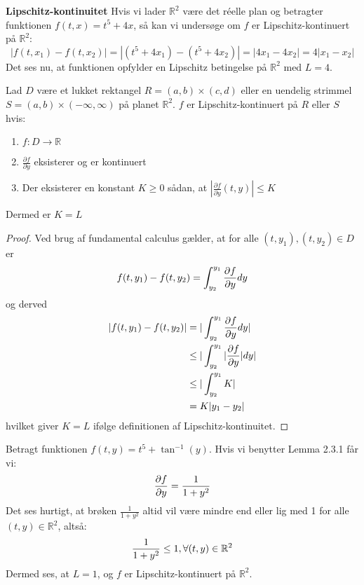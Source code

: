 \begin{Example}\textbf{Lipschitz-kontinuitet}\hfill \break
\textnormal{Hvis vi lader $\mathbb{R}^2$ være det réelle plan og betragter funktionen $f(t,x)=t^5+4x$, så kan vi undersøge om $f$ er Lipschitz-kontinuert på $\mathbb{R}^2$:} \hfill \break
$$|f(t,x_1)-f(t,x_2)|=|(t^5+4x_1)-(t^5+4x_2)|=|4x_1-4x_2|=4|x_1-x_2|$$ \hfill \break
\textnormal{Det ses nu, at funktionen opfylder en Lipschitz betingelse på $\mathbb{R}^2$ med $L=4$.}
\end{Example}
\begin{lemma}{}{}
Lad $D$ være et lukket rektangel $R=(a,b)\times(c,d)$ eller en uendelig strimmel $S=(a,b)\times(-\infty,\infty)$ på planet $\mathbb{R}^2$. $f$ er Lipschitz-kontinuert på $R$ eller $S$ hvis:

\begin{enumerate}
    \item $f:D \rightarrow \mathbb{R}$
    \item $\frac{\partial f}{\partial y}$ eksisterer og er kontinuert
    \item Der eksisterer en konstant $K\geq 0$ sådan, at $|\frac{\partial f}{\partial y}(t,y)|\leq K$
\end{enumerate}

Dermed er $K=L$
\end{lemma}
\begin{proof} \hfill \break
Ved brug af fundamental calculus gælder, at for alle $(t,y_1),(t,y_2) \in D$ er
\begin{align}
 f(t,y_1)-f(t,y_2)=\int_{y_2}^{y_1}\frac{\partial f}{\partial y} dy \notag
\end{align}
og derved
\begin{align}
 |f(t,y_1)-f(t,y_2)|&=|\int_{y_2}^{y_1}\frac{\partial f}{\partial y} dy| \notag \\
&\leq |\int_{y_2}^{y_1}|\frac{\partial f}{\partial y}| dy| \notag\\
&\leq |\int_{y_2}^{y_1}K| \notag \\
&=K|y_1-y_2| \notag
\end{align}
hvilket giver $K=L$ ifølge definitionen af Lipschitz-kontinuitet. \qedhere
\end{proof}
\hfill \break

\begin{Example}\hfill \break
\textnormal{Betragt funktionen $f(t,y)=t^5+\tan^{-1}(y)$. Hvis vi benytter Lemma 2.3.1 får vi:} \hfill \break
\begin{align}
\frac{\partial f}{\partial y}=\frac{1}{1+y^2} \notag
\end{align}
\textnormal{Det ses hurtigt, at brøken $\frac{1}{1+y^2}$ altid vil være mindre end eller lig med 1 for alle $(t,y)\in \mathbb{R}^2$, altså:}
\begin{align}
 \frac{1}{1+y^2}\leq 1, \forall(t,y) \in \mathbb{R}^2 \notag
\end{align}
\textnormal{Dermed ses, at $L=1$, og $f$ er Lipschitz-kontinuert på $\mathbb{R}^2$.}
\end{Example}

